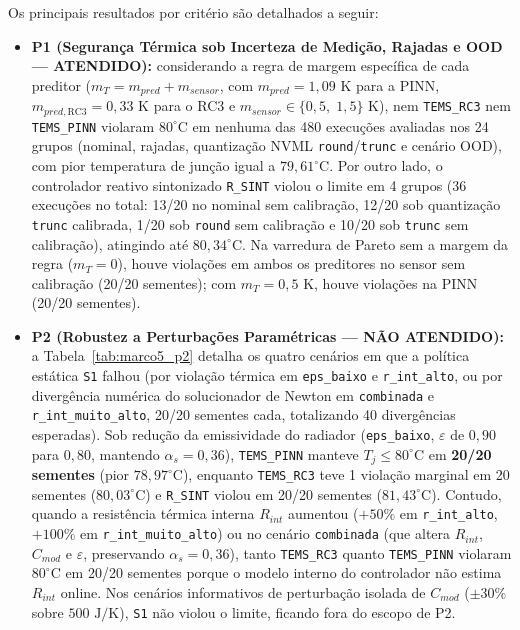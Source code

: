 Os principais resultados por critério são detalhados a seguir:

\begin{itemize}
    \item \textbf{P1 (Segurança Térmica sob Incerteza de Medição, Rajadas e OOD — ATENDIDO):} considerando a regra de margem específica de cada preditor ($m_T = m_{pred} + m_{sensor}$, com $m_{pred} = 1{,}09\text{ K}$ para a PINN, $m_{pred,\mathrm{RC3}} = 0{,}33\text{ K}$ para o RC3 e $m_{sensor} \in \{0{,}5,\; 1{,}5\}\text{ K}$), nem \texttt{TEMS\_RC3} nem \texttt{TEMS\_PINN} violaram $80^\circ\text{C}$ em nenhuma das 480 execuções avaliadas nos 24 grupos (nominal, rajadas, quantização NVML \texttt{round}/\texttt{trunc} e cenário OOD), com pior temperatura de junção igual a $79{,}61^\circ\text{C}$. Por outro lado, o controlador reativo sintonizado \texttt{R\_SINT} violou o limite em 4 grupos (36 execuções no total: 13/20 no nominal sem calibração, 12/20 sob quantização \texttt{trunc} calibrada, 1/20 sob \texttt{round} sem calibração e 10/20 sob \texttt{trunc} sem calibração), atingindo até $80{,}34^\circ\text{C}$. Na varredura de Pareto sem a margem da regra ($m_T = 0$), houve violações em ambos os preditores no sensor sem calibração (20/20 sementes); com $m_T = 0{,}5\text{ K}$, houve violações na PINN (20/20 sementes).

    \item \textbf{P2 (Robustez a Perturbações Paramétricas — NÃO ATENDIDO):} a Tabela~\ref{tab:marco5_p2} detalha os quatro cenários em que a política estática \texttt{S1} falhou (por violação térmica em \texttt{eps\_baixo} e \texttt{r\_int\_alto}, ou por divergência numérica do solucionador de Newton em \texttt{combinada} e \texttt{r\_int\_muito\_alto}, 20/20 sementes cada, totalizando 40 divergências esperadas). Sob redução da emissividade do radiador (\texttt{eps\_baixo}, $\varepsilon$ de $0{,}90$ para $0{,}80$, mantendo $\alpha_s = 0{,}36$), \texttt{TEMS\_PINN} manteve $T_j \le 80^\circ\text{C}$ em \textbf{20/20 sementes} (pior $78{,}97^\circ\text{C}$), enquanto \texttt{TEMS\_RC3} teve 1 violação marginal em 20 sementes ($80{,}03^\circ\text{C}$) e \texttt{R\_SINT} violou em 20/20 sementes ($81{,}43^\circ\text{C}$). Contudo, quando a resistência térmica interna $R_{int}$ aumentou ($+50\%$ em \texttt{r\_int\_alto}, $+100\%$ em \texttt{r\_int\_muito\_alto}) ou no cenário \texttt{combinada} (que altera $R_{int}$, $C_{mod}$ e $\varepsilon$, preservando $\alpha_s = 0{,}36$), tanto \texttt{TEMS\_RC3} quanto \texttt{TEMS\_PINN} violaram $80^\circ\text{C}$ em 20/20 sementes porque o modelo interno do controlador não estima $R_{int}$ online. Nos cenários informativos de perturbação isolada de $C_{mod}$ ($\pm 30\%$ sobre $500\text{ J/K}$), \texttt{S1} não violou o limite, ficando fora do escopo de P2.


\end{itemize}
